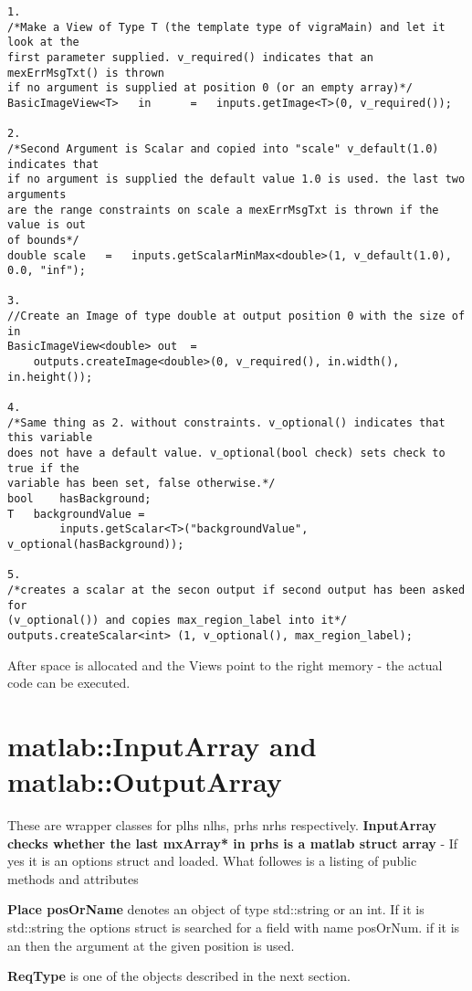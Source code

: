 \documentclass[a4paper,10pt]{article}
\begin{document}
\begin{lstlisting}[caption={Examples}]
1.
/*Make a View of Type T (the template type of vigraMain) and let it look at the 
first parameter supplied. v_required() indicates that an mexErrMsgTxt() is thrown 
if no argument is supplied at position 0 (or an empty array)*/
BasicImageView<T>   in      =   inputs.getImage<T>(0, v_required());

2.
/*Second Argument is Scalar and copied into "scale" v_default(1.0) indicates that 
if no argument is supplied the default value 1.0 is used. the last two arguments 
are the range constraints on scale a mexErrMsgTxt is thrown if the value is out 
of bounds*/
double scale   =   inputs.getScalarMinMax<double>(1, v_default(1.0), 0.0, "inf");

3.
//Create an Image of type double at output position 0 with the size of in
BasicImageView<double> out  =   
	outputs.createImage<double>(0, v_required(), in.width(), in.height());

4.
/*Same thing as 2. without constraints. v_optional() indicates that this variable 
does not have a default value. v_optional(bool check) sets check to true if the 
variable has been set, false otherwise.*/
bool	hasBackground;
T	backgroundValue = 
		inputs.getScalar<T>("backgroundValue", v_optional(hasBackground));	

5.
/*creates a scalar at the secon output if second output has been asked for 
(v_optional()) and copies max_region_label into it*/
outputs.createScalar<int> (1, v_optional(), max_region_label);
\end{lstlisting}

After space is allocated and the Views point to the right memory - the actual code can be executed.

\section{matlab::InputArray and matlab::OutputArray}
These are wrapper classes for plhs nlhs, prhs nrhs respectively. \textbf{InputArray checks 
whether the last mxArray* in prhs is a matlab struct array} - If yes it is an
options struct and loaded. What followes is a listing of public methods and attributes

\textbf{Place posOrName} denotes an object of type std::string or an int. If it is std::string
the options struct is searched for a field with name posOrNum. if it is an then 
the argument at the given position is used. 

\textbf{ReqType} is one of the objects described in the next section.
\end{document}
